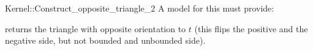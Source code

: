 \begin{ccRefFunctionObjectConcept}{Kernel::Construct_opposite_triangle_2}
A model for this must provide:


       {returns the triangle with opposite orientation to $t$
        (this flips the positive and the negative side, but
        not bounded and unbounded side).}

\end{ccRefFunctionObjectConcept}
